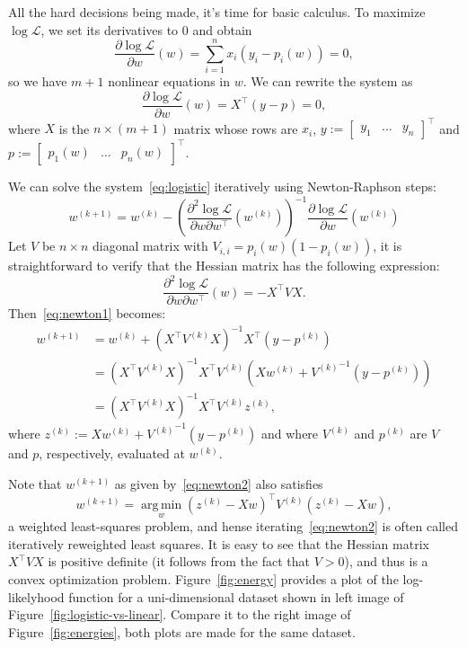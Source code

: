 \documentclass[notitlepage,oneside]{book}
\DeclareMathOperator*{\argmin}{arg\,min}
\begin{document}
All the hard decisions being made, it's time for basic calculus.
To maximize $\log\mathcal L$, we set its derivatives to 0 and obtain
$$
\frac{\partial\log\mathcal L}{\partial w}(w) = \sum_{i=1}^n x_i(y_i-p_i(w)) = 0,
$$
so we have $m+1$ nonlinear equations in $w$. 
We can rewrite the system as
\begin{equation}
\frac{\partial\log\mathcal L}{\partial w}(w) = X^\top (y-p) = 0,
\label{eq:logistic}
\end{equation}
where $X$ is the $n\times (m+1)$ matrix whose rows are $x_i$, $y:=\begin{bmatrix}y_1 & \dots & y_n\end{bmatrix}^\top$ and $p:=\begin{bmatrix}p_1(w) & \dots & p_n(w)\end{bmatrix}^\top$.

We can solve the system~\eqref{eq:logistic} iteratively using Newton-Raphson steps:
\begin{equation}
w^{(k+1)} = w^{(k)} - \left(\frac{\partial^2 \log \mathcal L}{\partial w \partial w^\top}\left(w^{(k)}\right)\right)^{-1}\frac{\partial \log \mathcal L}{\partial w}\left(w^{(k)}\right)
\label{eq:newton1}
\end{equation}
Let $V$ be $n\times n$ diagonal matrix with $V_{i,i} = p_i(w)(1-p_i(w))$, it is straightforward to verify that the Hessian matrix has the following expression:
$$
\frac{\partial^2 \log \mathcal L}{\partial w \partial w^\top}\left(w\right) = -X^\top V X.
$$
Then~\eqref{eq:newton1} becomes:
\begin{equation}
\label{eq:newton2}
\begin{split}
w^{(k+1)} &= w^{(k)} + \left(X^\top V^{(k)} X\right)^{-1} X^\top (y - p^{(k)}) \\
          &= \left(X^\top V^{(k)} X\right)^{-1} X^\top V^{(k)} \left(X w^{(k)} + {V^{(k)}}^{-1} (y - p^{(k)})\right) \\
          &= \left(X^\top V^{(k)} X\right)^{-1} X^\top V^{(k)} z^{(k)},
\end{split}
\end{equation}
where $z^{(k)}:=Xw^{(k)} + {V^{(k)}}^{-1} (y - p^{(k)})$ and where $V^{(k)}$ and $p^{(k)}$ are $V$ and $p$, respectively, evaluated at $w^{(k)}$.

Note that $w^{(k+1)}$ as given by~\eqref{eq:newton2} also satisfies
$$
w^{(k+1)} = \argmin\limits_w \left(z^{(k)}-Xw\right)^\top V^{(k)} \left(z^{(k)}-Xw\right),
$$
a weighted least-squares problem, and hense iterating~\eqref{eq:newton2} is often called iteratively reweighted least squares.
It is easy to see that the Hessian matrix $X^\top V X$ is positive definite (it follows from the fact that $V>0$), and thus is a convex optimization problem.
Figure~\ref{fig:energy} provides a plot of the log-likelyhood function for a uni-dimensional dataset shown in left image of Figure~\ref{fig:logistic-vs-linear}.
Compare it to the right image of Figure~\ref{fig:energies}, both plots are made for the same dataset.
\end{document}
